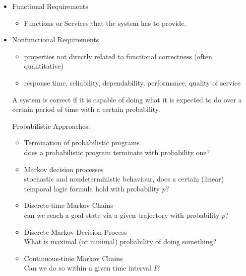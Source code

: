\documentclass[a4paper, 10pt]{article}
\begin{document}
\begin{itemize}
    \item Functional Requirements
    \begin{itemize}
        \item Functions or Services that the system has to provide.
    \end{itemize}
    \item Nonfunctional Requirements
    \begin{itemize}
        \item properties not directly related to functional correctness (often quantitative)
        \item response time, reliability, dependability, performance, quality of service
    \end{itemize}

    \begin{mdframed}[roundcorner=5pt,
    subtitlebelowline=false,subtitleaboveline=false,
    subtitlebackgroundcolor=blue!30,
    frametitlerule=true,
    frametitlebackgroundcolor=blue!30,
    frametitle={System Correctness}
    ]
    A system is correct if it is capable of doing what it is expected to do over a certain period of time with a certain probability.
    \end{mdframed}
    Probabilistic Approaches:
    \begin{itemize}
        \item Termination of probabilistic programs \\
        does a probabilistic program terminate with probability one?
        \item Markov decision processes\\
        stochastic and nondeterministic behaviour, does a certain (linear) temporal logic formula hold with probability $p$?
        \item Discrete-time Markov Chains \\
        can we reach a goal state via a given trajectory with probability $p$?
        \item Discrete Markov Decision Process\\
        What is maximal (or minimal) probability of doing something?
        \item Continuous-time Markov Chains \\
        Can we do so within a given time interval $I$?
    \end{itemize}
\end{itemize}
\end{document}
